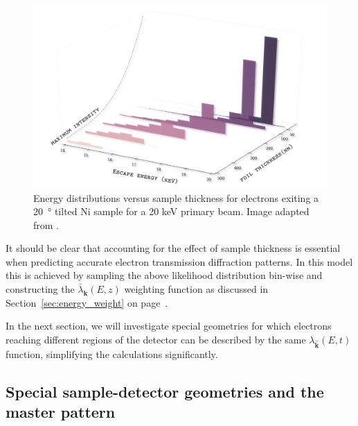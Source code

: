 \begin{figure}[ht]
\centering
\includegraphics[width=5in]{Figures/TKD_escapeE.png}
\caption[Energy distributions versus sample thickness.]{Energy distributions versus sample thickness for electrons exiting a \SI{20}{\degree}  tilted Ni sample for a 20 keV primary beam. Image adapted from \cite{PascalTKD}.  }
\label{fig:TKDescapeE}
\end{figure}



It should be clear that accounting for the effect of sample thickness is essential when predicting accurate electron transmission diffraction patterns. In this model this is achieved by sampling the above likelihood distribution bin-wise and constructing the $\bar{\lambda}_{\mathbf{k}}(E,z)$ weighting function as discussed in Section~\ref{sec:energy_weight} on page~\pageref{sec:energy_weight}.

In the next section, we will investigate special geometries for which electrons reaching different regions of the detector can be described by the same $\lambda_{\hat{\mathbf{k}}}(E,t)$ function, simplifying the calculations significantly. 



%
\subsection{Special sample-detector geometries and the master pattern}
\label{sec:geom}


